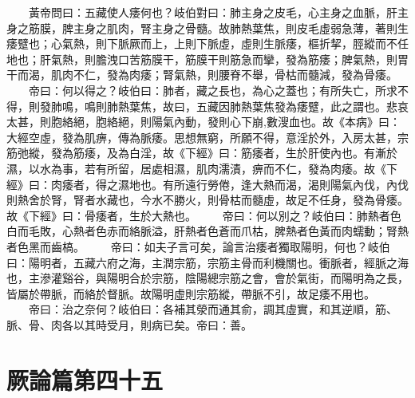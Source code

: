　　黃帝問曰：五藏使人痿何也？岐伯對曰：肺主身之皮毛，心主身之血脈，肝主身之筋膜，脾主身之肌肉，腎主身之骨髓。故肺熱葉焦，則皮毛虛弱急薄，著則生痿躄也；心氣熱，則下脈厥而上，上則下脈虛，虛則生脈痿，樞折挈，脛縱而不任地也；肝氣熱，則膽洩口苦筋膜干，筋膜干則筋急而攣，發為筋痿；脾氣熱，則胃干而渴，肌肉不仁，發為肉痿；腎氣熱，則腰脊不舉，骨枯而髓減，發為骨痿。
　　帝曰：何以得之？岐伯曰：肺者，藏之長也，為心之蓋也；有所失亡，所求不得，則發肺鳴，鳴則肺熱葉焦，故曰，五藏因肺熱葉焦發為痿躄，此之謂也。悲哀太甚，則胞絡絕，胞絡絕，則陽氣內動，發則心下崩,數溲血也。故《本病》曰：大經空虛，發為肌痹，傳為脈痿。思想無窮，所願不得，意淫於外，入房太甚，宗筋弛縱，發為筋痿，及為白淫，故《下經》曰：筋痿者，生於肝使內也。有漸於濕，以水為事，若有所留，居處相濕，肌肉濡漬，痹而不仁，發為肉痿。故《下經》曰：肉痿者，得之濕地也。有所遠行勞倦，逢大熱而渴，渴則陽氣內伐，內伐則熱舍於腎，腎者水藏也，今水不勝火，則骨枯而髓虛，故足不任身，發為骨痿。故《下經》曰：骨痿者，生於大熱也。
　　帝曰：何以別之？岐伯曰：肺熱者色白而毛敗，心熱者色赤而絡脈溢，肝熱者色蒼而爪枯，脾熱者色黃而肉蠕動；腎熱者色黑而齒槁。
　　帝曰：如夫子言可矣，論言治痿者獨取陽明，何也？岐伯曰：陽明者，五藏六府之海，主潤宗筋，宗筋主骨而利機關也。衝脈者，經脈之海也，主滲灌谿谷，與陽明合於宗筋，陰陽總宗筋之會，會於氣街，而陽明為之長，皆屬於帶脈，而絡於督脈。故陽明虛則宗筋縱，帶脈不引，故足痿不用也。
　　帝曰：治之奈何？岐伯曰：各補其滎而通其俞，調其虛實，和其逆順，筋、脈、骨、肉各以其時受月，則病已矣。帝曰：善。


\section{厥論篇第四十五}

